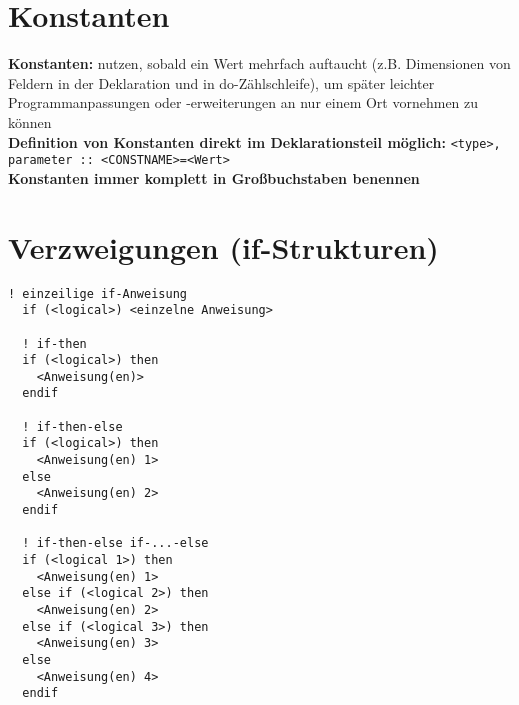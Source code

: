 \documentclass[a4paper, twocolumn]{scrarticle}
\begin{document}
\section{Konstanten}
\textbf{Konstanten:} nutzen, sobald ein Wert mehrfach auftaucht (z.B. Dimensionen von Feldern in der Deklaration und in do-Zählschleife), um später leichter Programmanpassungen oder -erweiterungen an nur einem Ort vornehmen zu können\\
\textbf{Definition von Konstanten direkt im Deklarationsteil möglich:} \lstinline|<type>, parameter :: <CONSTNAME>=<Wert>| \\
\textbf{Konstanten immer komplett in Großbuchstaben benennen}

\section{Verzweigungen (if-Strukturen)}
\begin{lstlisting}[caption={\bfseries Verzweigungen mit if}]
  ! einzeilige if-Anweisung
  if (<logical>) <einzelne Anweisung>
  
  ! if-then
  if (<logical>) then
    <Anweisung(en)>
  endif
  
  ! if-then-else
  if (<logical>) then
    <Anweisung(en) 1>
  else
    <Anweisung(en) 2>
  endif
  
  ! if-then-else if-...-else
  if (<logical 1>) then
    <Anweisung(en) 1>
  else if (<logical 2>) then
    <Anweisung(en) 2>
  else if (<logical 3>) then
    <Anweisung(en) 3>
  else
    <Anweisung(en) 4>
  endif
\end{lstlisting}
\end{document}
